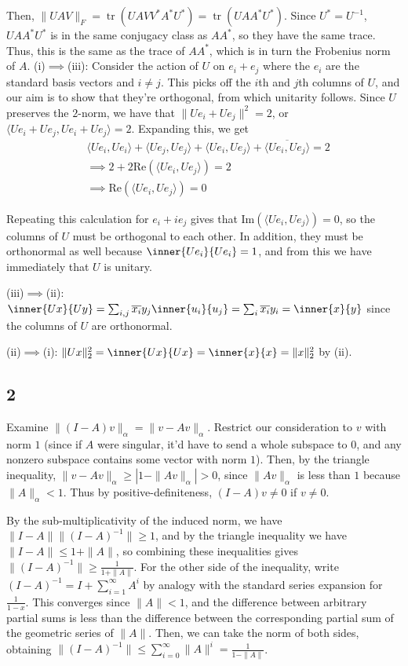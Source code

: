 \documentclass{article}
\newcommand{\conj}{\overline}
\DeclareMathOperator{\tr}{tr}
\begin{document}
Then, $\|UAV\|_F=\tr(UAVV^*A^*U^*)=\tr(UAA^*U^*)$. Since $U^*=U^{-1}$, $UAA^*U^*$ is in the same conjugacy class as $AA^*$, so they have the same trace. Thus, this is the same as the trace of $AA^*$, which is in turn the Frobenius norm of $A$.
(i)$\implies$(iii):
Consider the action of $U$ on $e_i+e_j$ where the $e_i$ are the standard basis vectors and $i\neq j$. This picks off the $i$th and $j$th columns of $U$, and our aim is to show that they're orthogonal, from which unitarity follows. Since $U$ preserves the $2$-norm, we have that $\|Ue_i+Ue_j\|^2=2$, or $\langle Ue_i+Ue_j,Ue_i+Ue_j\rangle=2$. Expanding this, we get 
\begin{align*}
    &\langle Ue_i,Ue_i\rangle+\langle Ue_j,Ue_j\rangle+\langle Ue_i,Ue_j\rangle+\conj{\langle Ue_i,Ue_j\rangle}=2\\
    &\implies2+2\text{Re}(\langle Ue_i,Ue_j\rangle)=2\\
    &\implies \text{Re}(\langle Ue_i,Ue_j\rangle)=0
\end{align*}

Repeating this calculation for $e_i+ie_j$ gives that $\text{Im}(\langle Ue_i,Ue_j\rangle)=0$, so the columns of $U$ must be orthogonal to each other. In addition, they must be orthonormal as well because $\inner{Ue_i}{Ue_i}=1$, and from this we have immediately that $U$ is unitary.

(iii)$\implies$(ii): $\inner{Ux}{Uy}=\sum_{i,j}\conj{x_i}y_j\inner{u_i}{u_j}=\sum_i\conj{x_i}y_i=\inner{x}{y}$ since the columns of $U$ are orthonormal.

(ii)$\implies$(i): $\|Ux\|_2^2=\inner{Ux}{Ux}=\inner{x}{x}=\|x\|_2^2$ by (ii).
\subsection*{2}
Examine $\|(I-A)v\|_\alpha=\|v-Av\|_\alpha$. Restrict our consideration to $v$ with norm $1$ (since if $A$ were singular, it'd have to send a whole subspace to $0$, and any nonzero subspace contains some vector with norm $1$). Then, by the triangle inequality, $\|v-Av\|_\alpha\geq\left|1-\|Av\|_\alpha\right|>0$, since $\|Av\|_\alpha$ is less than $1$ because $\|A\|_\alpha<1$. Thus by positive-definiteness, $(I-A)v\neq0$ if $v\neq0$.

By the sub-multiplicativity of the induced norm, we have $\|I-A\|\|(I-A)^{-1}\|\geq1$, and by the triangle inequality we have $\|I-A\|\leq1+\|A\|$, so combining these inequalities gives $\|(I-A)^{-1}\|\geq\frac{1}{1+\|A\|}$. For the other side of the inequality, write $(I-A)^{-1}=I+\sum_{i=1}^\infty A^i$ by analogy with the standard series expansion for $\frac{1}{1-x}$. This converges since $\|A\|<1$, and the difference between arbitrary partial sums is less than the difference between the corresponding partial sum of the geometric series of $\|A\|$. Then, we can take the norm of both sides, obtaining $\|(I-A)^{-1}\|\leq\sum_{i=0}^\infty\|A\|^i=\frac{1}{1-\|A\|}$.
\end{document}
